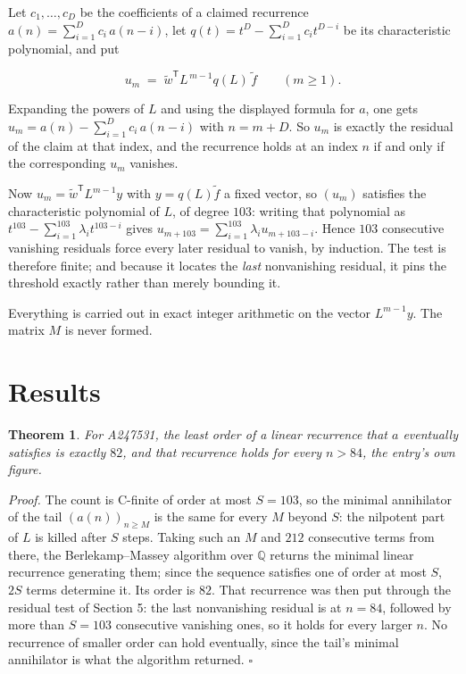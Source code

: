 \documentclass[11pt]{article}
\newtheorem{theorem}{Theorem}
\theoremstyle{definition}
\begin{document}
Let $c_1,\dots,c_D$ be the coefficients of a claimed recurrence $a(n) = \sum_{i=1}^{D} c_i\,a(n-i)$, let $q(t) = t^{D} - \sum_{i=1}^{D} c_i t^{D-i}$ be its characteristic polynomial, and put

\[u_m \;=\; \tilde w^{\mathsf T} L^{\,m-1} q(L)\,\tilde f \qquad (m \ge 1).\]

Expanding the powers of $L$ and using the displayed formula for $a$, one gets $u_m = a(n) - \sum_{i=1}^{D} c_i\,a(n-i)$ with $n = m + D$. So $u_m$ is exactly the residual of the claim at that index, and the recurrence holds at an index $n$ if and only if the corresponding $u_m$ vanishes.

Now $u_m = \tilde w^{\mathsf T} L^{m-1} y$ with $y = q(L)\tilde f$ a fixed vector, so $(u_m)$ satisfies the characteristic polynomial of $L$, of degree $103$: writing that polynomial as $t^{103} - \sum_{i=1}^{103} \lambda_i t^{103-i}$ gives $u_{m+103} = \sum_{i=1}^{103} \lambda_i u_{m+103-i}$. Hence $103$ consecutive vanishing residuals force every later residual to vanish, by induction. The test is therefore finite; and because it locates the {\itshape last} nonvanishing residual, it pins the threshold exactly rather than merely bounding it.

Everything is carried out in exact integer arithmetic on the vector $L^{m-1}y$. The matrix $M$ is never formed.

\section{Results}

\begin{theorem} For A247531, the least order of a linear recurrence that $a$ eventually satisfies is exactly $82$, and that recurrence holds for every $n > 84$, the entry's own figure.\end{theorem}

{\itshape Proof.} The count is C-finite of order at most $S = 103$, so the minimal annihilator of the tail $(a(n))_{n \ge M}$ is the same for every $M$ beyond $S$: the nilpotent part of $L$ is killed after $S$ steps. Taking such an $M$ and $212$ consecutive terms from there, the Berlekamp--Massey algorithm over $\mathbb{Q}$ returns the minimal linear recurrence generating them; since the sequence satisfies one of order at most $S$, $2S$ terms determine it. Its order is $82$. That recurrence was then put through the residual test of Section 5: the last nonvanishing residual is at $n = 84$, followed by more than $S = 103$ consecutive vanishing ones, so it holds for every larger $n$. No recurrence of smaller order can hold eventually, since the tail's minimal annihilator is what the algorithm returned. $\square$
\end{document}
